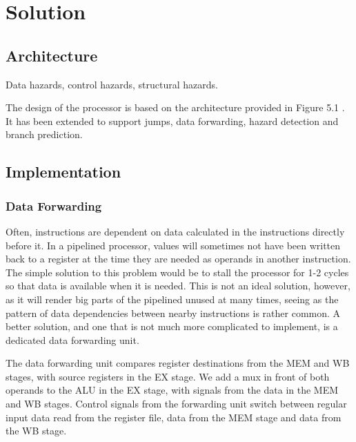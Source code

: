 \chapter{Solution}


\section{Architecture}

Data hazards, control hazards, structural hazards.

The design of the processor is based on the architecture provided in Figure 5.1 \cite[p. 50]{compendium}.
It has been extended to support jumps, data forwarding, hazard detection and branch prediction.

\section{Implementation}

\subsection{Data Forwarding}
Often, instructions are dependent on data calculated in the instructions directly before it.
In a pipelined processor, values will sometimes not have been written back to a register at the time they are needed as operands in another instruction.
The simple solution to this problem would be to stall the processor for 1-2 cycles so that data is available when it is needed.
This is not an ideal solution, however, as it will render big parts of the pipelined unused at many times, seeing as the pattern of data dependencies between nearby instructions is rather common.
A better solution, and one that is not much more complicated to implement, is a dedicated data forwarding unit.

The data forwarding unit compares register destinations from the MEM and WB stages, with source registers in the EX stage.
We add a mux in front of both operands to the ALU in the EX stage, with signals from the data in the MEM and WB stages.
Control signals from the forwarding unit switch between regular input data read from the register file, data from the MEM stage and data from the WB stage.

